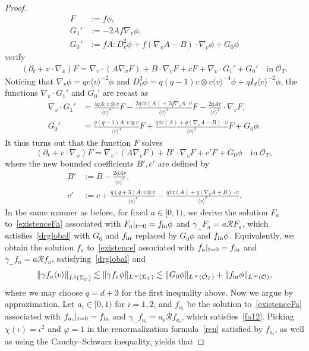\documentclass[AHL,Unicode,longabstracts,published]{cedram}
\newcommand*\p{\partial}
\newcommand*\trace{\mathrm{tr}}
\newcommand*\fin {f_{\rm in}}
\newcommand*\RR {\mathcal{R}}
\newcommand*\OO {\mathcal{O}}
\newcommand{\la}{\langle}
\newcommand{\ra}{\rangle}
\begin{document}
\begin{proof}
\begin{align*}
F&:=f\phi,\\
G_1'&:= -2Af\nabla_v\phi,\\
G_0'&:= fA:D_v^2\phi + f\left(\nabla_vA-B\right)\cdot\nabla_v\phi +G_0\phi
\end{align*}
verify
\begin{align*}
\left(\p_t+v\cdot\nabla_x\right)F = \nabla_v\cdot\left(A\nabla_vF\right) +B\cdot\nabla_v F +cF +\nabla_v\cdot G_1' + G_0' \quad\text{in}\; \OO_T.
\end{align*}
Noticing that $\nabla_v\phi=qv\la v\ra^{-2}\phi$ and $D_v^2\phi=q(q-1)v\otimes v\la v\ra^{-4}\phi+qI_d\la v\ra^{-2}\phi$, the functions $\nabla_v\cdot G_1'$ and $G_0'$ are recast as
\begin{align*}
\nabla_v\cdot G_1'&= \frac{4qA:v\otimes v}{\la v\ra^4}F -\frac{2q\,\trace(A) + 2q\nabla_vA\cdot v}{\la v\ra^2}F - \frac{2qA v}{\la v\ra^2}\cdot\nabla_vF,\\
G_0'&= \frac{q(q-1)A:v\otimes v}{\la v\ra^4}F + \frac{q\,\trace(A)+q(\nabla_vA-B)\cdot v}{\la v\ra^2} F +G_0\phi.
\end{align*}
It thus turns out that the function $F$ solves
\begin{equation}\label{existenceFa}
\left(\p_t+v\cdot\nabla_x\right)F = \nabla_v\cdot\left(A\nabla_vF\right) +B'\cdot\nabla_v F +c'F +G_0\phi \quad\text{in}\; \OO_T,
\end{equation}
where the new bounded coefficients $B',c'$ are defined by
\begin{align*}
B'&:=B- \frac{2q A v}{\la v\ra^2},\\
c'&:=c+\frac{q(q+3)A:v\otimes v}{\la v\ra^4} -\frac{q\,\trace(A)+q(\nabla_vA+B)\cdot v}{\la v\ra^2}.
\end{align*}
In the same manner as before, for fixed $a\in[0,1)$, we derive the solution $F_a$ to~\eqref{existenceFa} associated with $F_a|_{t=0}=\fin\phi$ and $\gamma_-F_a=a\RR F_a$, which satisfies~\eqref{drglobal} with $G_0$ and $\fin$ replaced by $G_0\phi$ and $\fin\phi$. Equivalently, we obtain the solution $f_a$ to~\eqref{existence} associated with $f_a|_{t=0}=\fin$ and $\gamma_-f_a=a\RR f_a$, satisfying~\eqref{drglobal} and
\begin{equation}\label{fa12}
\left\|\gamma f_a\la v\ra\right\|_{L^2(\Sigma_T)}
\lesssim \|\gamma f_a\phi\|_{L^\infty(\Sigma_T)}
\lesssim \|G_0\phi\|_{L^\infty(\OO_T)} + \|\fin\phi\|_{L^\infty(\OO)},
\end{equation}
where we may choose $q=d+3$ for the first inequality above. Now we argue by approximation. Let $a_i\in[0,1)$ for $i=1,2$, and $f_{a_i}$ be the solution to~\eqref{existenceFa} associated with $f_{a_i}|_{t=0}=\fin$ and $\gamma_-f_{a_i}=a_i\RR f_{a_i}$, which satisfies~\eqref{fa12}. Picking $\chi(\iota)=\iota^2$ and $\varphi=1$ in the renormalization formula~\eqref{ren} satisfied by $f_{a_i}$, as well as using the Cauchy--Schwarz inequality, yields that

\end{proof}
\end{document}
